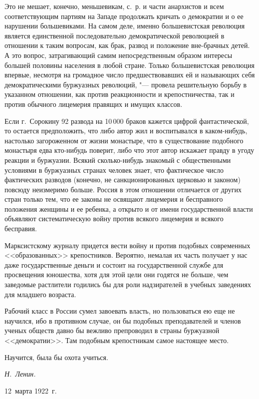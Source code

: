 Это не мешает, конечно, меньшевикам, с.~р. и части анархистов и всем
соответствующим партиям на Западе продолжать кричать о демократии и о ее
нарушении большевиками. На самом деле, именно большевистская революция
является единственной последовательно демократической революцией в
отношении к таким вопросам, как брак, развод и положение вне-брачных детей.
А это вопрос, затрагивающий самим непосредственным образом интересы большей
половины населения в любой стране. Только большевистская революция впервые,
несмотря на громадное число предшествовавших ей и называющих себя
демократическими буржуазных революций, "--- провела решительную борьбу в
указанном отношении, как против реакционности и крепостничества, так и
против обычного лицемерия правящих и имущих классов.

Если г.~Сорокину 92 развода на 10\,000 браков кажется
цифрой фантастической, то остается предположить, что либо автор жил и
воспитывался в каком-нибудь, настолько загороженном от жизни монастыре, что
в существование подобного монастыря едва кто-нибудь поверит, либо что этот
автор искажает правду в угоду реакции и буржуазии. Всякий сколько-нибудь
знакомый с общественными условиями в буржуазных странах человек знает, что
фактическое число фактических разводов (конечно, не санкционированных
церковью и законом) повсюду неизмеримо больше. Россия в этом отношении
отличается от других стран только тем, что ее законы не освящают лицемерия
и бесправного положения женщины и ее ребенка, а открыто и от имени
государственной власти объявляют систематическую войну против всякого
лицемерия и всякого бесправия.

Марксистскому журналу придется вести войну и против подобных современных
<<образованных>> крепостников. Вероятно, немалая их часть получает у нас даже
государственные деньги и состоит на государственной службе для просвещения
юношества, хотя для этой цели они годятся не больше, чем заведомые
растлители годились бы для роли надзирателей в учебных заведениях для
младшего возраста.

Рабочий класс в России сумел завоевать власть, но пользоваться ею еще не
научился, ибо в противном случае, он бы подобных преподавателей и членов
ученых обществ давно бы вежливо препроводил в страны буржуазной
<<демократии>>. Там подобным крепостникам самое настоящее место.

Научится, была бы охота учиться.

{\raggedleft
\textit{Н.~Ленин.}
\par}

12~марта 1922~г.


\bigskip
